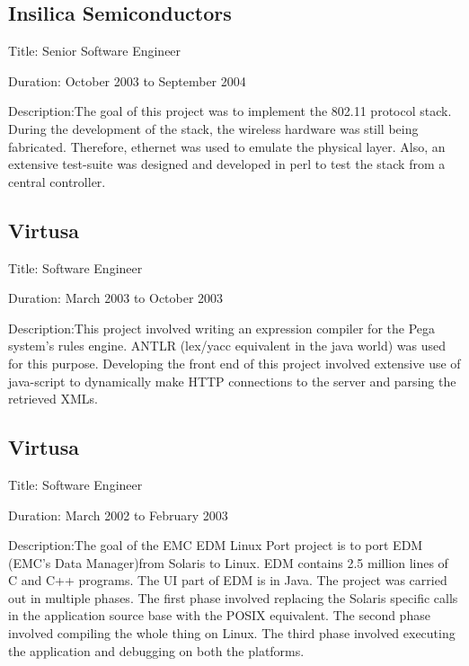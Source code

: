 \documentclass [a4paper,11pt] {article}
\begin{document}
\subsection*{Insilica Semiconductors}
\begin{description}
\item{Title:} Senior Software Engineer
\item{Duration:} October 2003 to September 2004
\item{Description:}The goal of this project was to implement the 802.11 protocol stack. During the development of the stack, the wireless hardware was still being fabricated. Therefore, ethernet was used to emulate the physical layer.  Also, an extensive test-suite was designed and developed in perl to test the stack from a central controller.
\end{description}


\subsection*{Virtusa}
\begin{description}
\item{Title:} Software Engineer
\item{Duration:} March 2003 to October 2003
\item{Description:}This project involved writing an expression compiler for the Pega system's rules engine. ANTLR (lex/yacc equivalent in the java world) was used for this purpose.  Developing the front end of this project involved extensive use of java-script to dynamically make HTTP connections to the server and parsing the retrieved XMLs.
\end{description}


\subsection*{Virtusa}
\begin{description}
\item{Title:} Software Engineer
\item{Duration:} March 2002 to February 2003
\item{Description:}The goal of the EMC EDM Linux Port project is to port EDM (EMC's Data Manager)from Solaris to Linux. EDM contains 2.5 million lines of C and C++ programs. The UI part of EDM is in Java.  The project was carried out in multiple phases. The first phase involved replacing the Solaris specific calls in the application source base with the POSIX equivalent. The second phase involved compiling the whole thing on Linux. The third phase involved executing the application and debugging on both the platforms.
\end{description}
\end{document}
